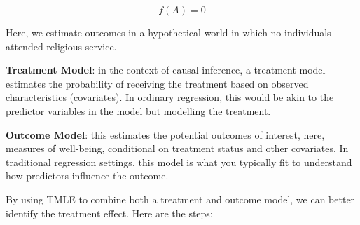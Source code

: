 \documentclass[
  singlecolumn]{article}
\begin{document}
\[f(A) = 0 \]

Here, we estimate outcomes in a hypothetical world in which no
individuals attended religious service.

\textbf{Treatment Model}: in the context of causal inference, a
treatment model estimates the probability of receiving the treatment
based on observed characteristics (covariates). In ordinary regression,
this would be akin to the predictor variables in the model but modelling
the treatment.

\textbf{Outcome Model}: this estimates the potential outcomes of
interest, here, measures of well-being, conditional on treatment status
and other covariates. In traditional regression settings, this model is
what you typically fit to understand how predictors influence the
outcome.

By using TMLE to combine both a treatment and outcome model, we can
better identify the treatment effect. Here are the steps:
\end{document}
